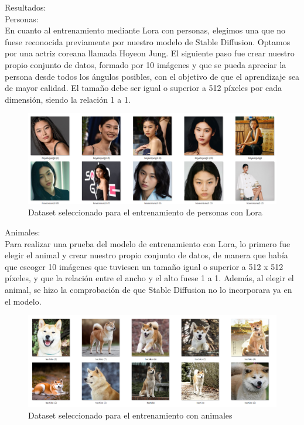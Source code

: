 Resultados:\\

Personas:\\
En cuanto al entrenamiento mediante Lora con personas, elegimos una que no fuese reconocida previamente por nuestro modelo de Stable Diffusion. Optamos por una actriz coreana llamada Hoyeon Jung. El siguiente paso fue crear nuestro propio conjunto de datos, formado por 10 imágenes y que se pueda apreciar la persona desde todos los ángulos posibles, con el objetivo de que el aprendizaje sea de mayor calidad. El tamaño debe ser igual o superior a 512 píxeles por cada dimensión, siendo la relación 1 a 1.
\begin{figure}[h]
	\centering
	\includegraphics[width = 0.7
	\textwidth]{Imagenes/Vectorial/datasethoyeon.png}
	\caption{Dataset seleccionado para el entrenamiento de personas con Lora}
	\label{fig:sampleImage}
\end{figure}

Animales:\\
Para realizar una prueba del modelo de entrenamiento con Lora, lo primero fue elegir el animal y crear nuestro propio conjunto de datos, de manera que había que escoger 10 imágenes que tuviesen un tamaño igual o superior a 512 x 512 píxeles, y que la relación entre el ancho y el alto fuese 1 a 1. Además, al elegir el animal, se hizo la comprobación de que Stable Diffusion no lo incorporara ya en el modelo.\\ 
\begin{figure}[h]
	\centering
	\includegraphics[width = 0.7
	\textwidth]{Imagenes/Vectorial/dataset_hachiko.png}
	\caption{Dataset seleccionado para el entrenamiento con animales}
	\label{fig:sampleImage}
\end{figure}

